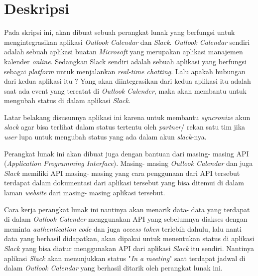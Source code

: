 \documentclass[a4paper,twoside]{article}
\begin{document}
\title{\@judultopik}
\author{\nama \textendash \@npm} 

\newcommand{\nama}{Sandy Giovanni S.}
\newcommand{\@npm}{2015730041}
\newcommand{\@judultopik}{Integrasi \textit{Outlook Calendar} dan \textit{Slack}} %
\newcommand{\jumpemb}{1} %
\newcommand{\tanggal}{29/01/2019}


\maketitle


\section{Deskripsi}
Pada skripsi ini, akan dibuat sebuah perangkat lunak yang berfungsi untuk mengintegrasikan aplikasi \textit{Outlook Calendar} dan \textit{Slack}.\textit{ Outlook Calendar} sendiri adalah sebuah aplikasi buatan \textit{Microsoft} yang merupakan aplikasi manajemen kalender \textit{online}. Sedangkan Slack sendiri adalah sebuah aplikasi yang berfungsi sebagai \textit{platform} untuk menjalankan \textit{real-time chatting}. Lalu apakah hubungan dari kedua aplikasi itu ? Yang akan diintegrasikan dari kedua aplikasi itu adalah saat ada event yang tercatat di \textit{Outlook Calender}, maka akan membantu untuk mengubah status di dalam aplikasi \textit{Slack}. 

Latar belakang disusunnya aplikasi ini karena untuk membantu \textit{syncronize} akun \textit{slack} agar bisa terlihat dalam status tertentu oleh \textit{partner}/ rekan satu tim jika \textit{user} lupa untuk mengubah status yang ada dalam akun \textit{slack}-nya. 

Perangkat lunak ini akan dibuat juga dengan bantuan dari masing- masing API (\textit{Application Programming Interface}). Masing- masing \textit{Outlook Calendar} dan juga \textit{Slack} memiliki API masing- masing yang cara penggunaan dari API tersebut terdapat dalam dokumentasi dari aplikasi tersebut yang bisa ditemui di dalam laman \textit{website} dari masing- masing aplikasi tersebut. 

Cara kerja perangkat lunak ini nantinya akan menarik data- data yang terdapat di dalam \textit{Outlook Calender} menggunakan API yang sebelumnya diakses dengan meminta \textit{authentication code} dan juga \textit{access token} terlebih dahulu, lalu nanti data yang berhasil didapatkan, akan dipakai untuk menentukan status di aplikasi \textit{Slack} yang bisa diatur menggunakan API dari aplikasi \textit{Slack} itu sendiri. Nantinya aplikasi \textit{Slack} akan menunjukkan status "\textit{In a meeting}" saat terdapat jadwal di dalam \textit{Outlook Calendar} yang berhasil ditarik oleh perangkat lunak ini.  
\end{document}
